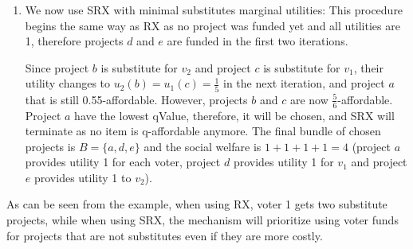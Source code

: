 \documentclass[runningheads]{llncs}
\begin{document}
\begin{example}
\begin{enumerate}
    \item We now use SRX  with minimal substitutes marginal utilities: This procedure begins  the same way as RX as no project was funded yet and all utilities are 1, therefore   projects $d$ and $e$ are funded in the first two iterations. 
    
    Since  project $b$ is substitute for $v_2$ and project $c$ is substitute for $v_1$, their utility changes  to $u_2(b)=u_1(c)=\frac{1}{5}$ in the next iteration, and project $a$ that is  still 0.55-affordable. However, projects $b$ and $c$ are now $\frac{5}{6}$-affordable. Project $a$ have the lowest qValue, therefore, it will be chosen, and SRX will terminate as no item is q-affordable anymore.
    The final bundle of chosen projects is $B=\{a,d,e\}$ and the social welfare is $1+1+1+1=4$ (project $a$ provides utility 1 for each voter, project $d$ provides utility 1 for $v_1$ and project $e$ provides utility 1 to $v_2$).
    
    
\end{enumerate}
\end{example}

As can be seen from the example,  when using  RX, voter 1 gets two substitute projects, while when using SRX, the mechanism will prioritize using voter funds for projects that are not substitutes  even if they are more costly.
\end{document}
